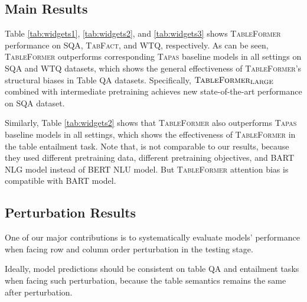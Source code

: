 \documentclass[11pt]{article}
\newcommand{\model}{\textsc{TableFormer}\xspace}
\begin{document}
\subsection{Main Results}
Table \ref{tab:widgets1}, \ref{tab:widgets2}, and \ref{tab:widgets3} shows \textsc{TableFormer} performance on \textsc{SQA, TabFact}, and \textsc{WTQ}, respectively. As can be seen, \model outperforms corresponding \textsc{Tapas} baseline models in all settings on SQA and \textsc{WTQ} datasets, which shows the general effectiveness of \textsc{TableFormer}'s structural biases in Table QA datasets. Specifically, $\textsc{TableFormer}_{\text{LARGE}}$ combined with intermediate pretraining achieves new state-of-the-art performance on SQA dataset.

Similarly, Table \ref{tab:widgets2} shows that \textsc{TableFormer} also outperforms \textsc{Tapas} baseline models in all settings, which shows the effectiveness of \textsc{TableFormer} in the table entailment task.
Note that, \citet{liu2021tapex} is not comparable to our results, because they used different pretraining data, different pretraining objectives, and \textsc{BART NLG} model instead of \textsc{BERT NLU} model. But \textsc{TableFormer} attention bias is compatible with BART model. %


\subsection{Perturbation Results}
\label{perturb-sec}
One of our major contributions is to systematically evaluate models' performance when facing row and column order perturbation in the testing stage. 

Ideally, model predictions should be consistent on table QA and entailment tasks when facing such perturbation, because the table semantics remains the same after perturbation.
\end{document}
